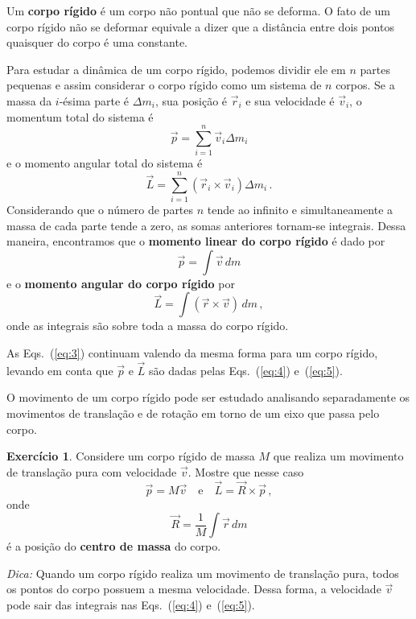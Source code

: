 \documentclass[papersize=a4,DIV=calc,twocolumn=on]{scrartcl}
\theoremstyle{definition}
\newtheorem{ex}{Exercício}[section]
\begin{document}
Um \textbf{corpo rígido} é um corpo não pontual que não se deforma. O
fato de um corpo rígido não se deformar equivale a dizer que a
distância entre dois pontos quaisquer do corpo é uma constante.

Para estudar a dinâmica de um corpo rígido, podemos dividir ele em $n$
partes pequenas e assim considerar o corpo rígido como um sistema de
$n$ corpos. Se a massa da $i$-ésima parte é $\Delta m_i$, sua posição
é $\vec r_i$ e sua velocidade é $\vec v_i$, o momentum total do
sistema é
$$\vec p=\sum_{i=1}^n\vec v_i\Delta m_i$$
e o momento angular total do sistema é
$$\vec L=\sum_{i=1}^n(\vec r_i\times\vec v_i)\Delta m_i\,.$$
Considerando que o número de partes $n$ tende ao infinito e
simultaneamente a massa de cada parte tende a zero, as somas
anteriores tornam-se integrais. Dessa maneira, encontramos que o
\textbf{momento linear do corpo rígido} é dado por
\begin{equation}
  \label{eq:4}
  \vec p=\int \vec v\,dm
\end{equation}
e o \textbf{momento angular do corpo rígido} por
\begin{equation}
  \label{eq:5}
  \vec L=\int (\vec r\times\vec v)\,dm\,,
\end{equation}
onde as integrais são sobre toda a massa do corpo rígido.

As Eqs.~(\ref{eq:3}) continuam valendo da mesma forma para um corpo
rígido, levando em conta que $\vec p$ e $\vec L$ são dadas pelas
Eqs.~(\ref{eq:4}) e~(\ref{eq:5}).

O movimento de um corpo rígido pode ser estudado analisando
separadamente os movimentos de translação e de rotação em torno de um
eixo que passa pelo corpo.

\begin{ex}
  Considere um corpo rígido de massa $M$ que realiza um movimento de
  translação pura com velocidade $\vec v$. Mostre que nesse caso
  \begin{equation}
    \label{eq:6}
    \vec p=M\vec v\quad\text{e}\quad \vec L=\vec R\times\vec p\,,
  \end{equation}
  onde
  $$\vec R=\frac{1}{M}\int \vec r\,dm$$
  é a posição do \textbf{centro de massa} do corpo.

  \noindent\textit{Dica:} Quando um corpo rígido realiza um movimento de translação pura, todos os pontos do corpo possuem a mesma velocidade. Dessa forma, a
  velocidade $\vec v$ pode sair das integrais nas Eqs.~(\ref{eq:4})
  e~(\ref{eq:5}).
\end{ex}
\end{document}
